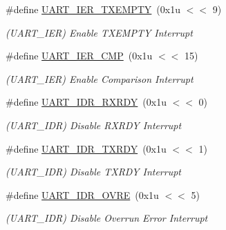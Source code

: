 \begin{DoxyCompactItemize}
\mbox{\label{group__SAMS70__UART_gafb01f4aeae498bfbf583c41acfbd778a}} 
\#define \mbox{\hyperlink{group__SAMS70__UART_gafb01f4aeae498bfbf583c41acfbd778a}{U\+A\+R\+T\+\_\+\+I\+E\+R\+\_\+\+T\+X\+E\+M\+P\+TY}}~(0x1u $<$$<$ 9)
\begin{DoxyCompactList}\small\item\em (U\+A\+R\+T\+\_\+\+I\+ER) Enable T\+X\+E\+M\+P\+TY Interrupt \end{DoxyCompactList}\item 
\mbox{\label{group__SAMS70__UART_ga2004f929d93784f4d125359d25bfd6c6}} 
\#define \mbox{\hyperlink{group__SAMS70__UART_ga2004f929d93784f4d125359d25bfd6c6}{U\+A\+R\+T\+\_\+\+I\+E\+R\+\_\+\+C\+MP}}~(0x1u $<$$<$ 15)
\begin{DoxyCompactList}\small\item\em (U\+A\+R\+T\+\_\+\+I\+ER) Enable Comparison Interrupt \end{DoxyCompactList}\item 
\mbox{\label{group__SAMS70__UART_ga444de2ead3afe527844d4f09a5f261d7}} 
\#define \mbox{\hyperlink{group__SAMS70__UART_ga444de2ead3afe527844d4f09a5f261d7}{U\+A\+R\+T\+\_\+\+I\+D\+R\+\_\+\+R\+X\+R\+DY}}~(0x1u $<$$<$ 0)
\begin{DoxyCompactList}\small\item\em (U\+A\+R\+T\+\_\+\+I\+DR) Disable R\+X\+R\+DY Interrupt \end{DoxyCompactList}\item 
\mbox{\label{group__SAMS70__UART_gab9d2b444a3c078333a81dc83eb3858fa}} 
\#define \mbox{\hyperlink{group__SAMS70__UART_gab9d2b444a3c078333a81dc83eb3858fa}{U\+A\+R\+T\+\_\+\+I\+D\+R\+\_\+\+T\+X\+R\+DY}}~(0x1u $<$$<$ 1)
\begin{DoxyCompactList}\small\item\em (U\+A\+R\+T\+\_\+\+I\+DR) Disable T\+X\+R\+DY Interrupt \end{DoxyCompactList}\item 
\mbox{\label{group__SAMS70__UART_ga7a2a8e703f4c639df2f6f9dce347f75d}} 
\#define \mbox{\hyperlink{group__SAMS70__UART_ga7a2a8e703f4c639df2f6f9dce347f75d}{U\+A\+R\+T\+\_\+\+I\+D\+R\+\_\+\+O\+V\+RE}}~(0x1u $<$$<$ 5)
\begin{DoxyCompactList}\small\item\em (U\+A\+R\+T\+\_\+\+I\+DR) Disable Overrun Error Interrupt \end{DoxyCompactList}\item 
$$
\end{DoxyCompactItemize}
